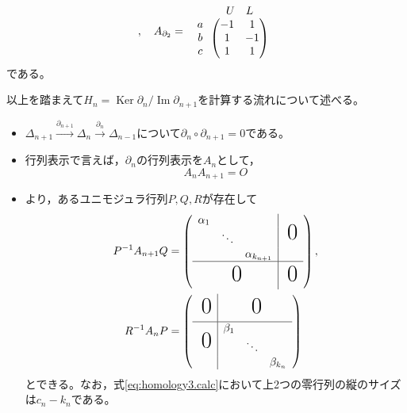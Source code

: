 \documentclass[uplatex]{jsarticle}
\DeclareMathOperator{\Image}{Im}
\DeclareMathOperator{\Kernel}{Ker}
\begin{document}
\begin{rei}[射影平面の場合]
\begin{equation}
\begin{array}{c@{\,}c}
    \end{array}
    , \quad 
    A_{\partial_{2}} = \begin{array}{c@{\,}c}
      & \begin{array}{cc}
        U & L
      \end{array} \\
      \begin{array}{c}
        a \\ b \\ c
      \end{array} &
      \begin{pmatrix}
      -1 & 1 \\
      1 & -1 \\
      1 & 1
    \end{pmatrix}
  \end{array}
  \end{equation}
  である。
\end{rei}

以上を踏まえて$H_{n} = \Kernel \partial_{n} / \Image \partial_{n+1}$を計算する流れについて述べる。

\sukima{}
\begin{itemize}
  \item $\Delta_{n+1} \xrightarrow{\partial_{n+1}} \Delta_{n} \xrightarrow{\partial_{n}} \Delta_{n-1}$について$\partial_{n} \circ \partial_{n+1} = 0$である。
  \item 行列表示で言えば，$\partial_{n}$の行列表示を$A_{n}$として，
  \begin{equation}
    A_{n} A_{n+1} = O
  \end{equation}
  \item {}より，あるユニモジュラ行列$P,Q,R$が存在して
  \begin{align}
    P^{-1} A_{n+1} Q &=
    \left( \begin{array}{ccc|c}
      \alpha_{1} &        &                  & \multirow{3}{*}{\BigZero} \\
                 & \ddots &                  & \\
                 &        & \alpha_{k_{n+1}} & \\ \hline
      \multicolumn{3}{c|}{\BigZero} & \BigZero
    \end{array} \right), \\
    \label{eq:homology3.calc}
    R^{-1} A_{n} P &=
    \left( \begin{array}{c|ccc}
      \BigZero                  & \multicolumn{3}{c}{\BigZero} \\ \hline
      \multirow{3}{*}{\BigZero} & \beta_{1} &        & \\
                                &           & \ddots & \\
                                &           &        & \beta_{k_{n}} \\
    \end{array} \right)
  \end{align}
  とできる。なお，式\eqref{eq:homology3.calc}において上2つの零行列の縦のサイズは$c_{n} - k_{n}$である。
\end{itemize}
\end{document}
